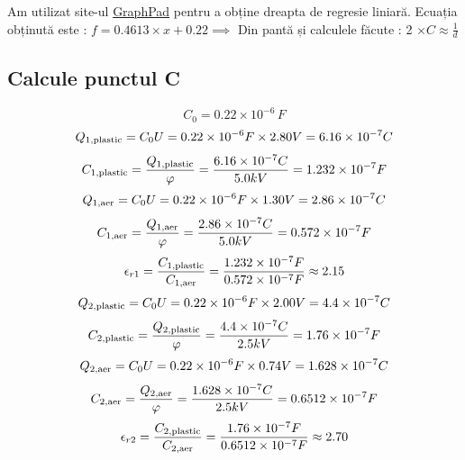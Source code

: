\documentclass[12pt]{article}
\begin{document}
Am utilizat site-ul \href{https://www.graphpad.com}{GraphPad} pentru a obține dreapta de regresie liniară. Ecuația obținută este : $f = 0.4613 \times x + 0.22 \implies$ Din pantă și calculele făcute : 2 $\times C \approx \frac{1}{d}$\\

\subsection{Calcule punctul C}
\begin{equation}
C_{0} = 0.22 \times 10^{-6} \, F
\end{equation}
\begin{equation}
Q_{1,\text{plastic}} = C_{0}U = 0.22 \times 10^{-6}F \times 2.80V = 6.16 \times 10^{-7}C\\
\end{equation}
\begin{equation}
C_{1,\text{plastic}} = \frac{Q_{1,\text{plastic}}}{\varphi} = \frac{6.16 \times 10^{-7}C}{5.0kV} = 1.232 \times 10^{-7}F\\
\end{equation}
\begin{equation}
Q_{1,\text{aer}} = C_{0}U = 0.22 \times 10^{-6}F \times 1.30V = 2.86 \times 10^{-7}C\\
\end{equation}
\begin{equation}
C_{1,\text{aer}} = \frac{Q_{1,\text{aer}}}{\varphi} = \frac{2.86 \times 10^{-7}C}{5.0kV} = 0.572 \times 10^{-7}F\\
\end{equation}
\begin{equation}
\epsilon_{r1} = \frac{C_{1,\text{plastic}}}{C_{1,\text{aer}}} = \frac{1.232 \times 10^{-7}F}{0.572 \times 10^{-7}F} \approx 2.15\\
\end{equation}
\begin{equation}
Q_{2,\text{plastic}} = C_{0}U = 0.22 \times 10^{-6}F \times 2.00V = 4.4 \times 10^{-7}C\\
\end{equation}
\begin{equation}
C_{2,\text{plastic}} = \frac{Q_{2,\text{plastic}}}{\varphi} = \frac{4.4 \times 10^{-7}C}{2.5kV} = 1.76 \times 10^{-7}F\\
\end{equation}
\begin{equation}
Q_{2,\text{aer}} = C_{0}U = 0.22 \times 10^{-6}F \times 0.74V = 1.628 \times 10^{-7}C\\
\end{equation}
\begin{equation}
C_{2,\text{aer}} = \frac{Q_{2,\text{aer}}}{\varphi} = \frac{1.628 \times 10^{-7}C}{2.5kV} = 0.6512 \times 10^{-7}F\\
\end{equation}
\begin{equation}
\epsilon_{r2} = \frac{C_{2,\text{plastic}}}{C_{2,\text{aer}}} = \frac{1.76 \times 10^{-7}F}{0.6512 \times 10^{-7}F} \approx 2.70\\
\end{equation}
\end{document}
